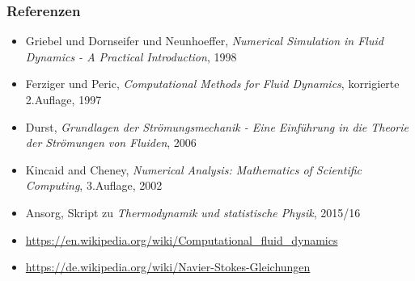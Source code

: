	\begin{frame}
		\frametitle{Referenzen}

		\begin{itemize}[label=$\circ$]
			\item Griebel und Dornseifer und Neunhoeffer, \textit{Numerical Simulation in Fluid Dynamics - A Practical Introduction}, 1998
			\item Ferziger und Peric, \textit{Computational Methods for Fluid Dynamics}, korrigierte 2.Auflage, 1997
			\item Durst, \textit{Grundlagen der Strömungsmechanik - Eine Einführung in die Theorie der Strömungen von Fluiden}, 2006
			\item Kincaid and Cheney, \textit{Numerical Analysis: Mathematics of Scientific Computing}, 3.Auflage, 2002
			\item Ansorg, Skript zu \textit{Thermodynamik und statistische Physik}, 2015/16
			\item \url{https://en.wikipedia.org/wiki/Computational_fluid_dynamics}
			\item \url{https://de.wikipedia.org/wiki/Navier-Stokes-Gleichungen}
		\end{itemize}
	\end{frame}

